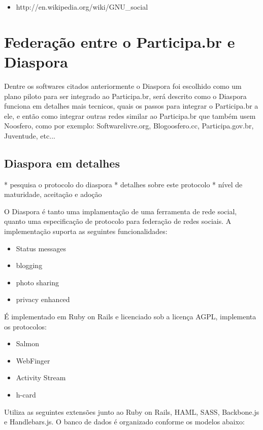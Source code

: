 \documentclass[12pt]{article}
\begin{document}
\begin{itemize}
  \item http://en.wikipedia.org/wiki/GNU\_social
\end{itemize}

\section{Federação entre o Participa.br e Diaspora}

Dentre os softwares citados anteriormente o Diaspora foi escolhido como um
plano piloto para ser integrado ao Participa.br, será descrito como o Diaspora
funciona em detalhes mais tecnicos, quais os passos para integrar o
Participa.br a ele, e então como integrar outras redes similar ao Participa.br
que também usem Noosfero, como por exemplo: Softwarelivre.org, Blogoosfero.cc,
Participa.gov.br, Juventude, etc...

\subsection{Diaspora em detalhes}

 * pesquisa o protocolo do diaspora
 * detalhes sobre este protocolo
 * nível de maturidade, aceitação e adoção

O Diaspora é tanto uma implamentação de uma ferramenta de rede social, quanto
uma especificação de protocolo para federação de redes sociais.
A implementação suporta as seguintes funcionalidades:

\begin{itemize}
  \item Status messages
  \item blogging
  \item photo sharing
  \item privacy enhanced
\end{itemize}

É implementado em Ruby on Rails e licenciado sob a licença
AGPL, implementa os protocolos:

\begin{itemize}
  \item Salmon
  \item WebFinger
  \item Activity Stream
  \item h-card
\end{itemize}

Utiliza as seguintes extensões junto ao Ruby on Rails, HAML, SASS, Backbone.js
e Handlebars.js. O banco de dados é organizado conforme os modelos abaixo:
\end{document}
